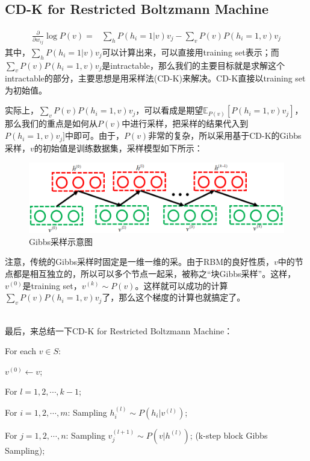 \documentclass[a4paper]{article}
\begin{document}
\subsection{CD-K for Restricted Boltzmann Machine}
\begin{equation}
    \begin{split}
    \frac{\partial }{\partial w_{ij}} \log P(v) 
    = & \sum_h P(h_i=1|v) v_j - \sum_v P(v) P(h_i=1,v)v_j
    \end{split}
\end{equation}
其中，$\sum_h P(h_i=1|v) v_j$可以计算出来，可以直接用training set表示；而$\sum_v P(v) P(h_i=1,v)v_j$是intractable，那么我们的主要目标就是求解这个intractable的部分，主要思想是用采样法(CD-K)来解决。CD-K直接以training set为初始值。

实际上，$\sum_v P(v) P(h_i=1,v)v_j$，可以看成是期望$\mathbb{E}_{P(v)}[P(h_i=1,v)v_j]$，那么我们的重点是如何从$P(v)$中进行采样，把采样的结果代入到$P(h_i=1,v)v_j]$中即可。由于，$P(v)$非常的复杂，所以采用基于CD-K的Gibbs采样，$v$的初始值是训练数据集，采样模型如下所示：
\begin{figure}[H]
    \centering
    \includegraphics[width=.85\textwidth]{微信图片_20200311212825.png}
    \caption{Gibbs采样示意图}
    \label{fig:my_label_1}
\end{figure}
注意，传统的Gibbs采样时固定是一维一维的采。由于RBM的良好性质，$v$中的节点都是相互独立的，所以可以多个节点一起采，被称之“块Gibbs采样”。这样，$v^{(0)}$是training set，$v^{(k)} \sim P(v)$。这样就可以成功的计算$\sum_v P(v) P(h_i=1,v)v_j$了，那么这个梯度的计算也就搞定了。

~\\

最后，来总结一下CD-K for Restricted Boltzmann Machine：

For each $v\in S$:

\qquad $v^{(0)}\longleftarrow v$;

\qquad For $l=1,2,\cdots,k-1$;

\qquad \qquad For $i=1,2,\cdots,m$: Sampling $h_i^{(l)} \sim P(h_i|v^{(l)})$;

\qquad \qquad For $ j=1,2,\cdots,n$: Sampling $v_j^{(l+1)} \sim P(v|h^{(l)})$; (k-step block Gibbs Sampling);
\end{document}
